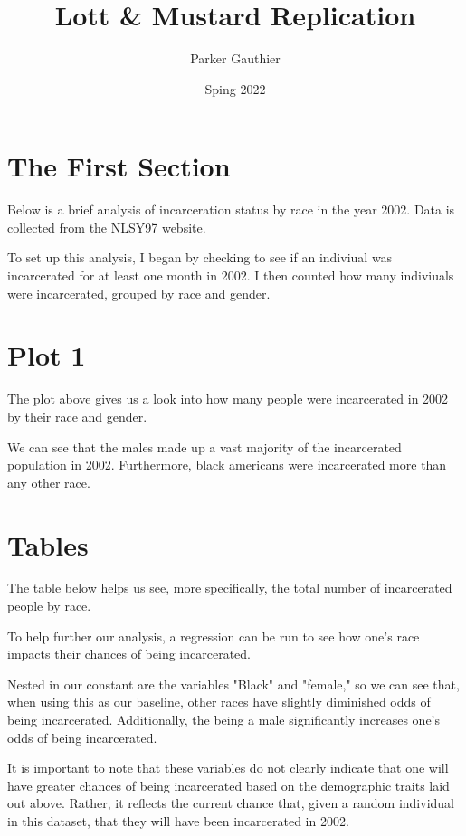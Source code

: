 \documentclass{article}
\author{Parker Gauthier}
\title{Lott & Mustard Replication}
\date{Sping 2022}
\begin{document}
\maketitle

\section{The First Section}

Below is a brief analysis of incarceration status by race in the year 2002.  Data is collected from the NLSY97 website.

To set up this analysis, I began by checking to see if an indiviual was incarcerated for at least one month in 2002.  I then counted how many indiviuals were incarcerated, grouped by race and gender.

\section{Plot 1}

The plot above gives us a look into how many people were incarcerated in 2002 by their race and gender.

We can see that the males made up a vast majority of the incarcerated population in 2002.  Furthermore, black americans were incarcerated more than any other race.

\section{Tables}

The table below helps us see, more specifically, the total number of incarcerated people by race.



To help further our analysis, a regression can be run to see how one's race impacts their chances of being incarcerated.

Nested in our constant are the variables "Black" and "female," so we can see that, when using this as our baseline, other races have slightly diminished odds of being incarcerated.  Additionally, the being a male significantly increases one's odds of being incarcerated.

It is important to note that these variables do not clearly indicate that one will have greater chances of being incarcerated based on the demographic traits laid out above.  Rather, it reflects the current chance that, given a random individual in this dataset, that they will have been incarcerated in 2002.
\end{document}

